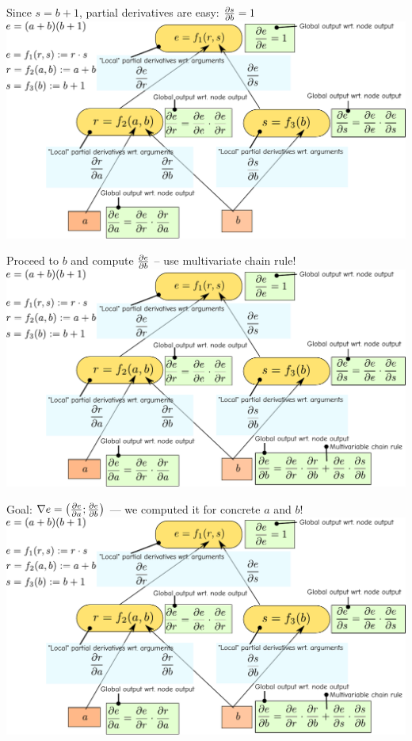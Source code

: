 \documentclass[12pt,aspectratio=169]{beamer}
\begin{document}
\begin{frame}{Since $s = b + 1$, partial derivatives are easy: $\pdv{s}{b} = 1$}
	\includegraphics[width=1.2\linewidth]{img/backprop09.pdf}
\end{frame}

\begin{frame}{Proceed to $b$ and compute $\pdv{e}{b}$ -- use multivariate chain rule!}
	\includegraphics[width=1.2\linewidth]{img/backprop10.pdf}
\end{frame}


\begin{frame}{Goal: $\nabla e = \left( \pdv{e}{a}; \pdv{e}{b} \right)$ --- we computed it for concrete $a$ and $b$!}
	\includegraphics[width=1.2\linewidth]{img/backprop10.pdf}
\end{frame}
\end{document}
